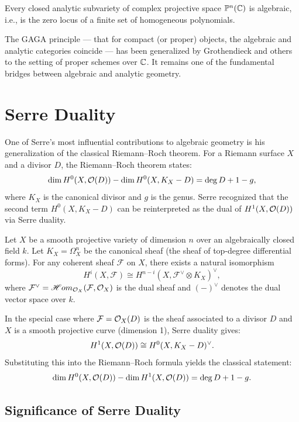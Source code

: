 \begin{corollary}
Every closed analytic subvariety of complex projective space \(\mathbb{P}^n(\mathbb{C})\) is algebraic, i.e., is the zero locus of a finite set of homogeneous polynomials.
\end{corollary}

The GAGA principle --- that for compact (or proper) objects, the algebraic and analytic categories coincide --- has been generalized by Grothendieck and others to the setting of proper schemes over \(\mathbb{C}\). It remains one of the fundamental bridges between algebraic and analytic geometry.

\section{Serre Duality}

One of Serre's most influential contributions to algebraic geometry is his generalization of the classical Riemann--Roch theorem. For a Riemann surface \(X\) and a divisor \(D\), the Riemann--Roch theorem states:
\[
\dim H^0(X, \mathcal{O}(D)) - \dim H^0(X, K_X - D) = \deg D + 1 - g,
\]
where \(K_X\) is the canonical divisor and \(g\) is the genus. Serre recognized that the second term \(H^0(X, K_X - D)\) can be reinterpreted as the dual of \(H^1(X, \mathcal{O}(D))\) via Serre duality.

\begin{theorem}
Let \(X\) be a smooth projective variety of dimension \(n\) over an algebraically closed field \(k\). Let \(K_X = \Omega^n_X\) be the canonical sheaf (the sheaf of top-degree differential forms). For any coherent sheaf \(\mathcal{F}\) on \(X\), there exists a natural isomorphism
\[
H^i(X, \mathcal{F}) \cong H^{n-i}(X, \mathcal{F}^\vee \otimes K_X)^\vee,
\]
where \(\mathcal{F}^\vee = \mathscr{H}om_{\mathcal{O}_X}(\mathcal{F}, \mathcal{O}_X)\) is the dual sheaf and \((-)^\vee\) denotes the dual vector space over \(k\).
\end{theorem}

In the special case where \(\mathcal{F} = \mathcal{O}_X(D)\) is the sheaf associated to a divisor \(D\) and \(X\) is a smooth projective curve (dimension 1), Serre duality gives:
\[
H^1(X, \mathcal{O}(D)) \cong H^0(X, K_X - D)^\vee.
\]
Substituting this into the Riemann--Roch formula yields the classical statement:
\[
\dim H^0(X, \mathcal{O}(D)) - \dim H^1(X, \mathcal{O}(D)) = \deg D + 1 - g.
\]

\subsection{Significance of Serre Duality}

